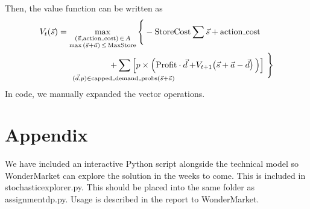 \documentclass[11pt,a4paper]{article}
\begin{document}
Then, the value function can be written as 
\begin{align*}
    V_{t}(\vec s) &= 
    \max_{ \substack{(\vec a, \mathrm{action{\mathunderscore}cost}) \,\in\, A \\ \max \,(\vec s + \vec a)\, \le\, \mathrm{MaxStore} } }\Bigg\{
        -\mathrm{StoreCost}\sum\vec s  + \mathrm{action{\mathunderscore}cost}\\ 
        &  \underset{(\vec d, p) \in \mathrm{capped{\mathunderscore}demand{\mathunderscore}probs}(\vec s + \vec a)}{\qquad\qquad \quad \quad + \sum \Big[p\times \Big( \mathrm{Profit} \cdot\vec d}   
         + V_{t+1} \big(\vec s + \vec a - \vec d\big)\,\Big) \Big]\,\,\Bigg\}
\end{align*}
In code, we manually expanded the vector operations.

\part{Appendix}
We have included an interactive Python script alongside the technical model 
so WonderMarket can explore the solution in the weeks to come. This is included
in stochastic{\textunderscore}explorer.py. This should be placed into the same 
folder as assignment{\textunderscore}dp.py. Usage is described in the report 
to WonderMarket.
\end{document}
